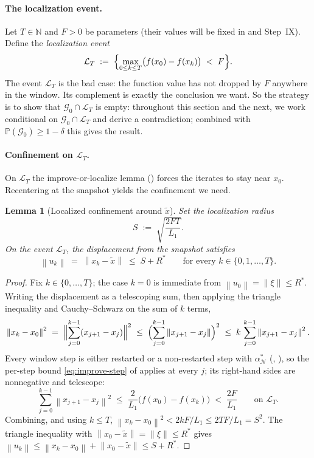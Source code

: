 \documentclass[11pt,a4paper]{article}
\theoremstyle{plain}
\newtheorem{lemma}{Lemma}
\theoremstyle{definition}
\newcommand{\N}{\mathbb{N}}
\newcommand{\norm}[1]{\left\|#1\right\|}
\newcommand{\Lone}{L_{1}}
\newcommand{\setN}{\mathcal{N}}
\newcommand{\snap}{\tilde{x}}
\renewcommand{\Pr}{\mathbb{P}}
\newcommand{\Rstar}{R^{*}}
\begin{document}
\paragraph{The localization event.}
Let $T\in\N$ and $F>0$ be parameters (their values will be fixed in
 and Step~IX). Define the
\emph{localization event}
\begin{equation}\label{eq:LT}
\mathcal{L}_T \;:=\; \Bigl\{\max_{0\le k\le T}\bigl(f(x_0)-f(x_k)\bigr) \;<\; F\Bigr\}.
\end{equation}
The event $\mathcal{L}_T$ is the bad case: the function value has not dropped
by $F$ anywhere in the window. Its complement is exactly the conclusion we
want. So the strategy is to show that $\mathcal{G}_{0}\cap\mathcal{L}_{T}$ is
empty: throughout this section and the next, we work conditional on
$\mathcal{G}_0 \cap \mathcal{L}_T$ and derive a contradiction; combined with
$\Pr(\mathcal{G}_0) \ge 1-\delta$ this gives the result.

\paragraph{Confinement on $\mathcal{L}_T$.}
On $\mathcal{L}_T$ the improve-or-localize lemma () forces
the iterates to stay near $x_0$. Recentering at the snapshot yields the
confinement we need.

\begin{lemma}[Localized confinement around $\snap$]\label{lem:localization}
Set the localization radius
\begin{equation}\label{eq:S-def}
S \;:=\; \sqrt{\frac{2FT}{\Lone}}.
\end{equation}
On the event $\mathcal{L}_T$, the displacement from the snapshot satisfies
\begin{equation}\label{eq:confine}
\norm{u_k} \;=\; \norm{x_k-\snap} \;\le\; S + \Rstar
\qquad\text{for every }k\in\{0,1,\dots,T\}.
\end{equation}
\end{lemma}

\begin{proof}
Fix $k\in\{0,\dots,T\}$; the case $k=0$ is immediate from
$\norm{u_{0}}=\norm{\xi}\le R^{*}$. Writing the displacement as a telescoping
sum, then applying the triangle inequality and Cauchy--Schwarz on the sum of
$k$ terms,
\[
\norm{x_{k}-x_{0}}^{2}
\;=\;\Bigl\|\sum_{j=0}^{k-1}(x_{j+1}-x_{j})\Bigr\|^{2}
\;\le\;\Bigl(\sum_{j=0}^{k-1}\norm{x_{j+1}-x_{j}}\Bigr)^{2}
\;\le\; k\,\sum_{j=0}^{k-1}\norm{x_{j+1}-x_{j}}^{2}.
\]
Every window step is either restarted or a non-restarted step with
$\alpha^{\ast}_{\setN}$ (, ), so
the per-step bound \eqref{eq:improve-step} of  applies at
every $j$; its right-hand sides are nonnegative and telescope:
\[
\sum_{j=0}^{k-1}\norm{x_{j+1}-x_{j}}^{2}
\;\le\;\frac{2}{\Lone}\bigl(f(x_{0})-f(x_{k})\bigr)
\;<\;\frac{2F}{\Lone}
\qquad\text{on }\mathcal{L}_{T}.
\]
Combining, and using $k\le T$,
$\norm{x_{k}-x_{0}}^{2} < 2kF/\Lone \le 2TF/\Lone = S^{2}$. The triangle
inequality with $\norm{x_{0}-\snap}=\norm{\xi}\le R^{*}$ gives
$\norm{u_{k}}\le\norm{x_{k}-x_{0}}+\norm{x_{0}-\snap}\le S+R^{*}$.
\end{proof}
\end{document}
